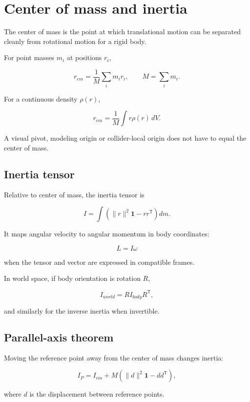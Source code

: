 \hypertarget{appendix-66742099f8a0}{}
\section{Center of mass and inertia}\label{appendix-66742099f8a0-center-of-mass-and-inertia}

The center of mass is the point at which translational motion can be separated cleanly from rotational motion for a rigid body.

For point masses \(m_i\) at positions \(r_i\),

\[
r_{cm}=\frac{1}{M}\sum_i m_i r_i,
\qquad
M=\sum_i m_i.
\]

For a continuous density \(\rho(r)\),

\[
r_{cm}=\frac{1}{M}\int r\rho(r)\,dV.
\]

A visual pivot, modeling origin or collider-local origin does not have to equal the center of mass.

\subsection{Inertia tensor}\label{appendix-66742099f8a0-inertia-tensor}

Relative to center of mass, the inertia tensor is

\[
I=
\int
\left(
\|r\|^2\mathbf{1}-rr^{\mathsf T}
\right)dm.
\]

It maps angular velocity to angular momentum in body coordinates:

\[
L=I\omega
\]

when the tensor and vector are expressed in compatible frames.

In world space, if body orientation is rotation \(R\),

\[
I_{world}=RI_{body}R^{\mathsf T},
\]

and similarly for the inverse inertia when invertible.

\subsection{Parallel-axis theorem}\label{appendix-66742099f8a0-parallel-axis-theorem}

Moving the reference point away from the center of mass changes inertia:

\[
I_P=
I_{cm}
+
M\left(
\|d\|^2\mathbf{1}-dd^{\mathsf T}
\right),
\]

where \(d\) is the displacement between reference points.


